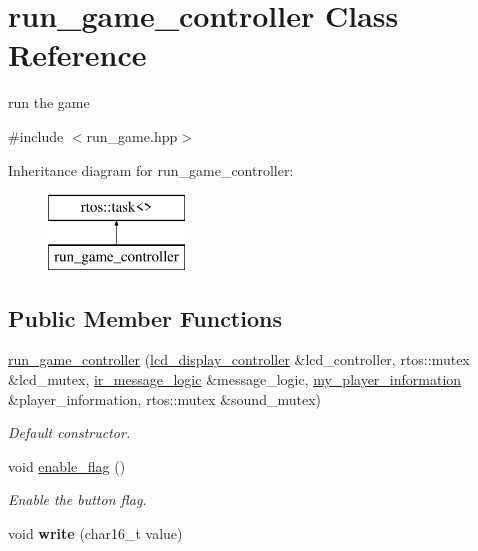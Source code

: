 \hypertarget{classrun__game__controller}{}\section{run\+\_\+game\+\_\+controller Class Reference}
\label{classrun__game__controller}


run the game  




{\ttfamily \#include $<$run\+\_\+game.\+hpp$>$}

Inheritance diagram for run\+\_\+game\+\_\+controller\+:\begin{figure}[H]
\begin{center}
\leavevmode
\includegraphics[height=2.000000cm]{classrun__game__controller}
\end{center}
\end{figure}
\subsection*{Public Member Functions}
\begin{DoxyCompactItemize}
\item 
\hyperlink{classrun__game__controller_aa61968bc65e1ad20a5065ccfd7d598da}{run\+\_\+game\+\_\+controller} (\hyperlink{classlcd__display__controller}{lcd\+\_\+display\+\_\+controller} \&lcd\+\_\+controller, rtos\+::mutex \&lcd\+\_\+mutex, \hyperlink{classir__message__logic}{ir\+\_\+message\+\_\+logic} \&message\+\_\+logic, \hyperlink{classmy__player__information}{my\+\_\+player\+\_\+information} \&player\+\_\+information, rtos\+::mutex \&sound\+\_\+mutex)
\begin{DoxyCompactList}\small\item\em Default constructor. \end{DoxyCompactList}\item 
void \hyperlink{classrun__game__controller_a45846159930efd40f9b20ecf72e36003}{enable\+\_\+flag} ()
\begin{DoxyCompactList}\small\item\em Enable the button flag. \end{DoxyCompactList}\item 
\hypertarget{classrun__game__controller_ae5329a8ebb79ad5021dd6eedd24f7e0e}{}\label{classrun__game__controller_ae5329a8ebb79ad5021dd6eedd24f7e0e} 
void {\bfseries write} (char16\+\_\+t value)
\end{DoxyCompactItemize}


